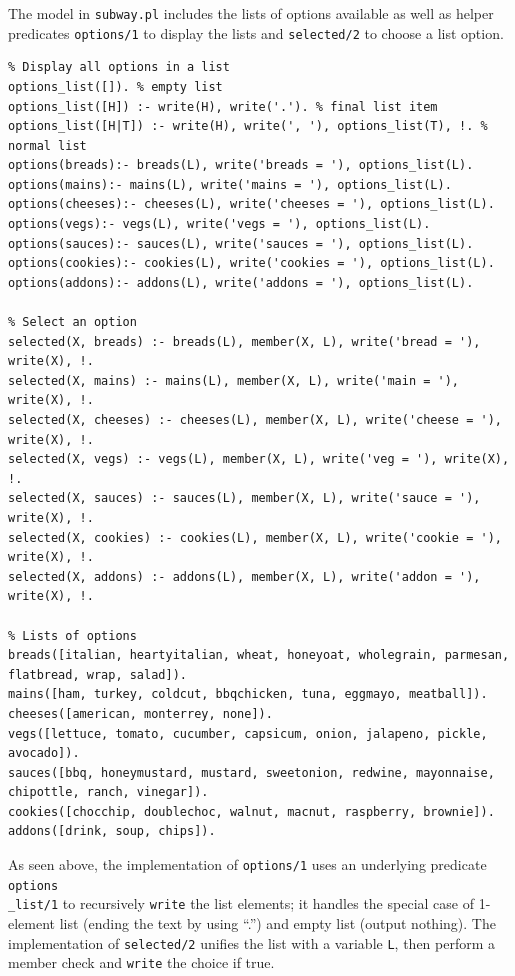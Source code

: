 \documentclass[11pt]{report}
\begin{document}
The model in \texttt{subway.pl} includes the lists of options available as well
as helper predicates \texttt{options/1} to display the lists and
\texttt{selected/2} to choose a list option.

\begin{lstlisting}
% Display all options in a list
options_list([]). % empty list
options_list([H]) :- write(H), write('.'). % final list item
options_list([H|T]) :- write(H), write(', '), options_list(T), !. % normal list
options(breads):- breads(L), write('breads = '), options_list(L).
options(mains):- mains(L), write('mains = '), options_list(L).
options(cheeses):- cheeses(L), write('cheeses = '), options_list(L).
options(vegs):- vegs(L), write('vegs = '), options_list(L).
options(sauces):- sauces(L), write('sauces = '), options_list(L).
options(cookies):- cookies(L), write('cookies = '), options_list(L).
options(addons):- addons(L), write('addons = '), options_list(L).

% Select an option
selected(X, breads) :- breads(L), member(X, L), write('bread = '), write(X), !.
selected(X, mains) :- mains(L), member(X, L), write('main = '), write(X), !.
selected(X, cheeses) :- cheeses(L), member(X, L), write('cheese = '), write(X), !.
selected(X, vegs) :- vegs(L), member(X, L), write('veg = '), write(X), !.
selected(X, sauces) :- sauces(L), member(X, L), write('sauce = '), write(X), !.
selected(X, cookies) :- cookies(L), member(X, L), write('cookie = '), write(X), !.
selected(X, addons) :- addons(L), member(X, L), write('addon = '), write(X), !.

% Lists of options
breads([italian, heartyitalian, wheat, honeyoat, wholegrain, parmesan, flatbread, wrap, salad]).
mains([ham, turkey, coldcut, bbqchicken, tuna, eggmayo, meatball]).
cheeses([american, monterrey, none]).
vegs([lettuce, tomato, cucumber, capsicum, onion, jalapeno, pickle, avocado]).
sauces([bbq, honeymustard, mustard, sweetonion, redwine, mayonnaise, chipottle, ranch, vinegar]).
cookies([chocchip, doublechoc, walnut, macnut, raspberry, brownie]).
addons([drink, soup, chips]).
\end{lstlisting}

As seen above, the implementation of \texttt{options/1} uses an underlying 
predicate \texttt{options\\\_list/1} to recursively \texttt{write} the list
elements; it handles the special case of 1-element list (ending the text by
using ``.'') and empty list (output nothing). The implementation of
\texttt{selected/2} unifies the list with a variable \texttt{L}, then perform
a member check and \texttt{write} the choice if true.
\end{document}
